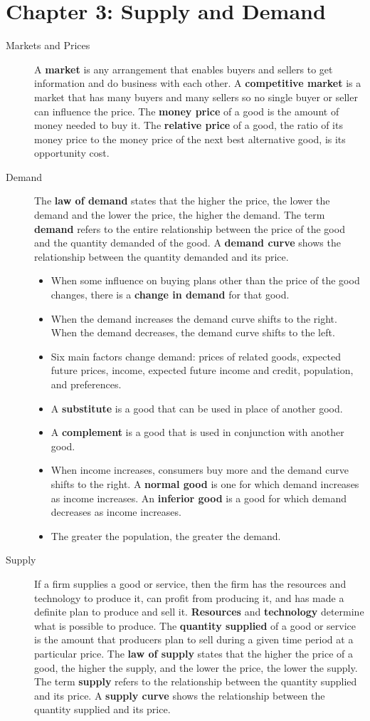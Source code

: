 \documentclass{article}
\begin{document}
\section*{Chapter 3: Supply and Demand}
\begin{description}
    \item [Markets and Prices] A \textbf{market} is any arrangement that enables buyers and sellers to get information and do business with each other. A \textbf{competitive market} is a market that has many buyers and many sellers so no single buyer or seller can influence the price. The \textbf{money price} of a good is the amount of money needed to buy it. The \textbf{relative price} of a good, the ratio of its money price to the money price of the next best alternative good, is its opportunity cost.
    \item [Demand] The \textbf{law of demand} states that the higher the price, the lower the demand and the lower the price, the higher the demand. The term \textbf{demand} refers to the entire relationship between the price of the good and the quantity demanded of the good. A \textbf{demand curve} shows the relationship between the quantity demanded and its price.
    \begin{itemize}
        \item When some influence on buying plans other than the price of the good changes, there is a \textbf{change in demand} for that good.
        \item When the demand increases the demand curve shifts to the right. When the demand decreases, the demand curve shifts to the left.
        \item Six main factors change demand: prices of related goods, expected future prices, income, expected future income and credit, population, and preferences.
        \item A \textbf{substitute} is a good that can be used in place of another good.
        \item A \textbf{complement} is a good that is used in conjunction with another good.
        \item When income increases, consumers buy more and the demand curve shifts to the right. A \textbf{normal good} is one for which demand increases as income increases. An \textbf{inferior good} is a good for which demand decreases as income increases.
        \item The greater the population, the greater the demand.
    \end{itemize}
    \item [Supply] If a firm supplies a good or service, then the firm has the resources and technology to produce it, can profit from producing it, and has made a definite plan to produce and sell it. \textbf{Resources} and \textbf{technology} determine what is possible to produce. The \textbf{quantity supplied} of a good or service is the amount that producers plan to sell during a given time period at a particular price. The \textbf{law of supply} states that the higher the price of a good, the higher the supply, and the lower the price, the lower the supply. The term \textbf{supply} refers to the relationship between the quantity supplied and its price. A \textbf{supply curve} shows the relationship between the quantity supplied and its price.

\end{description}
\end{document}
